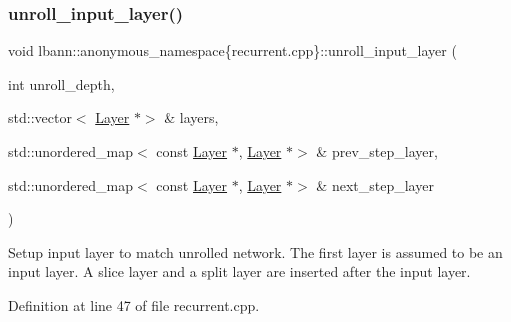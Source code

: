 \subsubsection{\texorpdfstring{unroll\+\_\+input\+\_\+layer()}{unroll\_input\_layer()}}
{\footnotesize\ttfamily void lbann\+::anonymous\+\_\+namespace\{recurrent.\+cpp\}\+::unroll\+\_\+input\+\_\+layer (\begin{DoxyParamCaption}\item[{int}]{unroll\+\_\+depth,  }\item[{std\+::vector$<$ \hyperlink{classlbann_1_1Layer}{Layer} $\ast$$>$ \&}]{layers,  }\item[{std\+::unordered\+\_\+map$<$ const \hyperlink{classlbann_1_1Layer}{Layer} $\ast$, \hyperlink{classlbann_1_1Layer}{Layer} $\ast$$>$ \&}]{prev\+\_\+step\+\_\+layer,  }\item[{std\+::unordered\+\_\+map$<$ const \hyperlink{classlbann_1_1Layer}{Layer} $\ast$, \hyperlink{classlbann_1_1Layer}{Layer} $\ast$$>$ \&}]{next\+\_\+step\+\_\+layer }\end{DoxyParamCaption})}

Setup input layer to match unrolled network. The first layer is assumed to be an input layer. A slice layer and a split layer are inserted after the input layer. 

Definition at line 47 of file recurrent.\+cpp.


